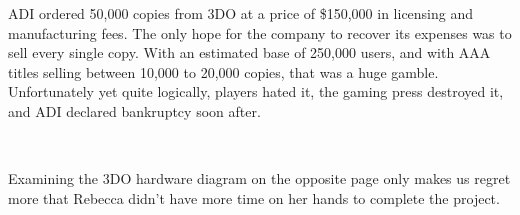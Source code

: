 \par
ADI ordered 50,000 copies from 3DO at a price of \$150,000 in licensing and manufacturing fees. The only hope for the company to recover its expenses was to sell every single copy. With an estimated base of 250,000 users, and with AAA titles selling between 10,000 to 20,000 copies, that was a huge gamble. Unfortunately yet quite logically, players hated it, the gaming press destroyed it, and ADI declared bankruptcy soon after. \\
\par
{}\\
\par
\vspace{20pt}


Examining the 3DO hardware diagram on the opposite page only makes us regret more that Rebecca didn't have more time on her hands to complete the project.\\
\par

